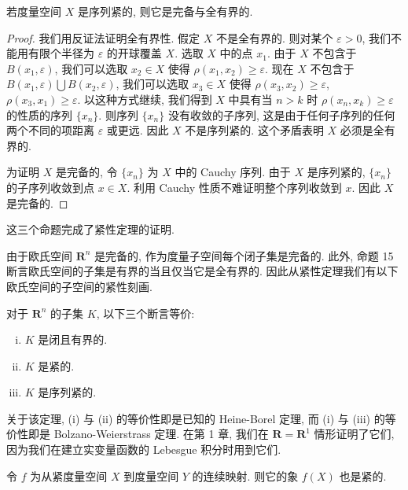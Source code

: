 \documentclass[../../main.tex]{subfiles}
\begin{document}
\begin{proposition}\label{proposition:ch09-序列紧完备全有界}
若度量空间 $X$ 是序列紧的, 则它是完备与全有界的.
\end{proposition}

\begin{proof}
我们用反证法证明全有界性. 假定 $X$ 不是全有界的. 则对某个 $\varepsilon>0$, 我们不能用有限个半径为 $\varepsilon$ 的开球覆盖 $X$. 选取 $X$ 中的点 $x_{1}$. 由于 $X$ 不包含于 $B(x_{1},\varepsilon)$, 我们可以选取 $x_{2}\in X$ 使得 $\rho(x_{1},x_{2})\geqslant\varepsilon$. 现在 $X$ 不包含于 $B(x_{1},\varepsilon)\bigcup B(x_{2},\varepsilon)$, 我们可以选取 $x_{3}\in X$ 使得 $\rho(x_{3},x_{2})\geqslant\varepsilon$, $\rho(x_{3},x_{1})\geqslant\varepsilon$. 以这种方式继续, 我们得到 $X$ 中具有当 $n>k$ 时 $\rho(x_{n},x_{k})\geqslant\varepsilon$ 的性质的序列 $\{x_{n}\}$. 则序列 $\{x_{n}\}$ 没有收敛的子序列, 这是由于任何子序列的任何两个不同的项距离 $\varepsilon$ 或更远. 因此 $X$ 不是序列紧的. 这个矛盾表明 $X$ 必须是全有界的.

为证明 $X$ 是完备的, 令 $\{x_{n}\}$ 为 $X$ 中的 Cauchy 序列. 由于 $X$ 是序列紧的, $\{x_{n}\}$ 的子序列收敛到点 $x\in X$. 利用 Cauchy 性质不难证明整个序列收敛到 $x$. 因此 $X$ 是完备的.
\end{proof}

这三个命题完成了紧性定理的证明.

由于欧氏空间 $\mathbf{R}^{n}$ 是完备的, 作为度量子空间每个闭子集是完备的. 此外, 命题 15 断言欧氏空间的子集是有界的当且仅当它是全有界的. 因此从紧性定理我们有以下欧氏空间的子空间的紧性刻画.

\begin{theorem}\label{theorem:ch09-Rn紧性刻画}
对于 $\mathbf{R}^{n}$ 的子集 $K$, 以下三个断言等价:
\begin{enumerate}[(i)]
\item $K$ 是闭且有界的.
\item $K$ 是紧的.
\item $K$ 是序列紧的.
\end{enumerate}
\end{theorem}

关于该定理, (i) 与 (ii) 的等价性即是已知的 Heine-Borel 定理, 而 (i) 与 (iii) 的等价性即是 Bolzano-Weierstrass 定理. 在第 1 章, 我们在 $\mathbf{R}=\mathbf{R}^{1}$ 情形证明了它们, 因为我们在建立实变量函数的 Lebesgue 积分时用到它们.

\begin{proposition}\label{proposition:ch09-紧集连续象紧}
令 $f$ 为从紧度量空间 $X$ 到度量空间 $Y$ 的连续映射. 则它的象 $f(X)$ 也是紧的.
\end{proposition}
\end{document}
